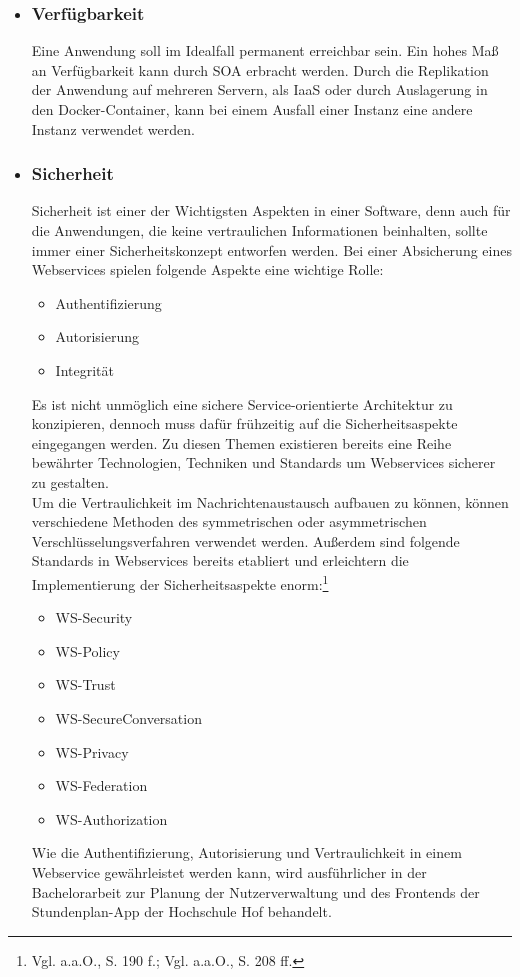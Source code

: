 \begin{itemize}
\item \subsubsection*{Verfügbarkeit} 
Eine Anwendung soll im Idealfall permanent erreichbar sein. Ein hohes Maß an Verfügbarkeit kann durch \ac{SOA} erbracht werden. Durch die Replikation der Anwendung auf mehreren Servern, als \ac{IaaS} oder durch Auslagerung in den Docker-Container, kann bei einem Ausfall einer Instanz eine andere Instanz verwendet werden.

\item \subsubsection*{Sicherheit} 
Sicherheit ist einer der Wichtigsten Aspekten in einer Software, denn auch für die Anwendungen, die keine vertraulichen Informationen beinhalten, sollte immer einer Sicherheitskonzept entworfen werden. Bei einer Absicherung eines Webservices spielen folgende Aspekte eine wichtige Rolle:
\begin{itemize}
\item Authentifizierung
\item Autorisierung
\item Integrität
\end{itemize}
Es ist nicht unmöglich eine sichere Service-orientierte Architektur zu konzipieren, dennoch muss dafür frühzeitig auf die Sicherheitsaspekte eingegangen werden. Zu diesen Themen existieren bereits eine Reihe bewährter Technologien, Techniken und Standards um Webservices sicherer zu gestalten\autocite[Vgl.][188\psq]{soamws}.
\\
\linebreak
Um die Vertraulichkeit im Nachrichtenaustausch aufbauen zu können, können verschiedene Methoden des symmetrischen oder asymmetrischen Verschlüsselungsverfahren verwendet werden. Außerdem sind folgende Standards in Webservices bereits etabliert und erleichtern die Implementierung der Sicherheitsaspekte enorm:\footnote{Vgl. a.a.O., S. 190 f.; Vgl. a.a.O., S. 208 ff.}
\begin{itemize}
\item WS-Security
\item WS-Policy
\item WS-Trust
\item WS-SecureConversation
\item WS-Privacy
\item WS-Federation
\item WS-Authorization
\end{itemize}
Wie die Authentifizierung, Autorisierung und Vertraulichkeit in einem Web\-service gewährleistet werden kann, wird ausführlicher in der Bachelorarbeit zur Planung der Nutzerverwaltung und des Frontends der Stundenplan-\ac{App} der Hochschule Hof behandelt\autocite[Vgl.][]{andreasba}. 


\end{itemize}
